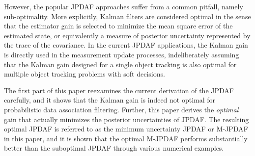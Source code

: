 
However, the popular JPDAF approaches suffer from a common pitfall, namely sub-optimality.
More explicitly, Kalman filters are considered optimal in the sense that the estimator gain is selected to minimize the mean square error of the estimated state, or equivalently a measure of posterior uncertainty represented by the trace of the covariance.
In the current JPDAF applications, the Kalman gain is directly used in the measurement update processes, indeliberately assuming that the Kalman gain designed for a single object tracking is also optimal for multiple object tracking problems with soft decisions.



The first part of this paper reexamines the current derivation of the JPDAF carefully, and it shows that the Kalman gain is indeed not optimal for probabilistic data association filtering. Further, this paper derives the \textit{optimal} gain that actually minimizes the posterior uncertainties of JPDAF.  
The resulting optimal JPDAF is referred to as the minimum uncertainty JPDAF or M-JPDAF in this paper, and it is shown that the optimal M-JPDAF performs substantially better than the suboptimal JPDAF through various numerical examples.

